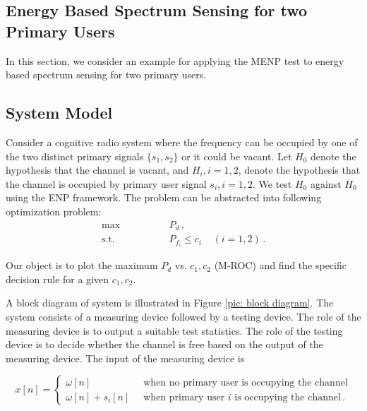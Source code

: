\documentclass[12pt,journal,a4paper,twoside,doublecolumn]{IEEEtran}
\begin{document}
\begin{spacing}{1.0}
\section{Energy Based Spectrum Sensing for two Primary Users}
In this section, we consider an example for applying the MENP test to energy based spectrum sensing for two primary users.

\subsection{System Model}
Consider a cognitive radio system where the frequency can be occupied by one of the two  distinct primary signals $\{ s_1, s_2 \}$ or it could be vacant.
Let  $H_0$  denote the hypothesis that the channel is vacant, and $H_i, i = 1, 2$, denote the hypothesis that the channel is occupied by primary user signal $s_i, i=1, 2$. We test $H_0$ against $\overline{H}_0$ using the ENP framework. The problem can be abstracted into following optimization problem:
\begin{equation}
  \label{equ: energy spectrum sensing}
  \begin{split}
  \max \;\;\;\;\;\;\;\;\;\;\;\;\;\;\; &P_d\,,\\
  \text{s.t.} \;\;\;\;\;\;\;\;\;\;\;\;\;\;\; &P_{f_i} \leq c_i\;\;\;\;(i = 1, 2)\,.
  \end{split}
\end{equation}

Our object is to plot the maximum $P_d$ vs. $c_1, c_2$ (M-ROC) and find the specific decision rule for a given $c_1, c_2$.

A block diagram of system is illustrated in Figure \ref{pic: block diagram}. The system consists of a measuring device followed by a testing device. The role of the measuring device is to output a suitable test statistics. The role of the testing device is to decide whether the channel is free based on the output of the measuring device. The input of the measuring device is

\begin{equation}
  \label{equ: expression of x}
  x[n]=\begin{cases}
    \omega[n]\;\;\;\;\;\;\;\;\;\;\;\;\;\;&\text{when no primary user is occupying the channel}\\
    \omega[n] + s_i[n]\;\;&\text{when primary user $i$ is occupying the channel}\,.
  \end{cases}
\end{equation}


\end{spacing}
\end{document}
